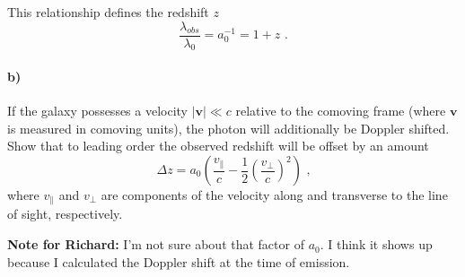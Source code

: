 \documentclass[12pt]{article}
\begin{document}
This relationship defines the redshift $z$
\begin{equation}
    \frac{\lambda_{obs}}{\lambda_0} = a_0^{-1} = 1 + z \text{ .}
\end{equation}

\paragraph{b)} If the galaxy possesses a velocity $\left|\mathbf{v}\right| \ll
c$ relative to the comoving frame (where $\mathbf{v}$ is measured in comoving
units), the photon will additionally be Doppler shifted. Show that to leading
order the observed redshift will be offset by an amount
\begin{equation}
    \Delta z = a_0 \left(\frac{v_\parallel}{c}
    - \frac{1}{2} \left(\frac{v_\perp}{c}\right)^2\right) \text{ ,}
\end{equation}
where $v_\parallel$ and $v_\perp$ are components of the velocity along and
transverse to the line of sight, respectively.

\textbf{Note for Richard:} I'm not sure about that factor of $a_0$. I think it
shows up because I calculated the Doppler shift at the time of emission.
\end{document}
